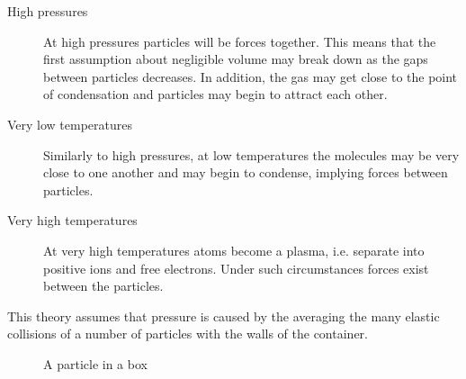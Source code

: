 \documentclass[main.tex]{subfiles}
\begin{document}
\begin{description}
  \item[High pressures] At high pressures particles will be forces together. This means that the first assumption about negligible volume may break down as the gaps between particles decreases. In addition, the gas may get close to the point of condensation and particles may begin to attract each other.
  \item[Very low temperatures] Similarly to high pressures, at low temperatures the molecules may be very close to one another and may begin to condense, implying forces between particles.
  \item[Very high temperatures] At very high temperatures atoms become a plasma, i.e. separate into positive ions and free electrons. Under such circumstances forces exist between the particles.
\end{description}


This theory assumes that pressure is caused by the averaging the many elastic collisions of a number of particles with the walls of the container.

\begin{figure}[ht]
    \begin{center}\end{center}
    \caption{A particle in a box}
\end{figure}
\end{document}
